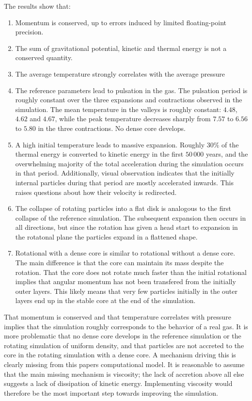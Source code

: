 \documentclass[../main.tex]{subfiles}
\begin{document}
The results show that:
\begin{enumerate}
    \item Momentum is conserved, up to errors induced by limited floating-point precision.
    \item The sum of gravitational potential, kinetic and thermal energy is not a conserved
        quantity.
    \item The average temperature strongly correlates with the average pressure
    \item The reference parameters lead to pulsation in the gas. The pulsation period is roughly
        constant over the three expansions and contractions observed in the simulation. The mean
        temperature in the valleys is roughly constant: $4.48$, $4.62$ and $4.67$, while the peak
        temperature decreases sharply from $7.57$ to $6.56$ to $5.80$ in the three contractions. No
        dense core develops.
    \item A high initial temperature leads to massive expansion. Roughly $30\%$ of the thermal
        energy is converted to kinetic energy in the first $50 \, 000$ years, and the overwhelming
        majority of the total acceleration during the simulation occurs in that period.
        Additionally, visual observation indicates that the initially internal particles during that
        period are mostly accelerated inwards. This raises questions about how their velocity is
        redirected.
    \item The collapse of rotating particles into a flat disk is analogous to the first collapse of
        the reference simulation. The subsequent expansion then occurs in all directions, but since
        the rotation has given a head start to expansion in the rotatonal plane the particles expand
        in a flattened shape.
    \item Rotational with a dense core is similar to rotational without a dense core. The main
        difference is that the core can maintain its mass despite the rotation. That the core does
        not rotate much faster than the initial rotational implies that angular momentum has not
        been transfered from the initially outer layers. This likely means that very few particles
        initially in the outer layers end up in the stable core at the end of the simulation.
\end{enumerate}

That momentum is conserved and that temperature correlates with pressure implies that the simulation
roughly corresponds to the behavior of a real gas. It is more problematic that no dense core
develops in the reference simulation or the rotating simulation of uniform density, and that
particles are not accreted to the core in the rotating simulation with a dense core. A mechanism
driving this is clearly missing from this papers computational model. It is reasonable to assume
that the main missing mechanism is viscosity; the lack of accretion above all else suggests a lack
of dissipation of kinetic energy. Implementing viscosity would therefore be the most important step
towards improving the simulation.
\end{document}
